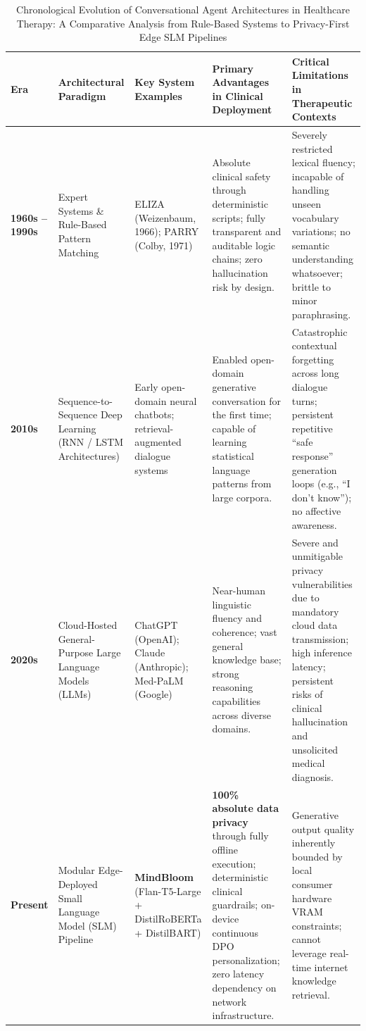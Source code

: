 \documentclass[12pt,twoside]{article}
\begin{document}
\begin{table}[p]
\centering
\Large
\renewcommand{\arraystretch}{4.2}
\setlength{\tabcolsep}{14pt}
\begin{adjustbox}{max width=\textwidth, max totalheight=0.88\textheight, keepaspectratio}
\begin{tabular}{|p{3.0cm}|p{5.2cm}|p{4.8cm}|p{7.0cm}|p{8.5cm}|}
\hline
\rowcolor{gray!20}
\textbf{Era} & \textbf{Architectural Paradigm} & \textbf{Key System Examples} & \textbf{Primary Advantages in Clinical Deployment} & \textbf{Critical Limitations in Therapeutic Contexts} \\
\hline
\textbf{1960s -- 1990s} & Expert Systems \& Rule-Based Pattern Matching & ELIZA (Weizenbaum, 1966); PARRY (Colby, 1971) & Absolute clinical safety through deterministic scripts; fully transparent and auditable logic chains; zero hallucination risk by design. & Severely restricted lexical fluency; incapable of handling unseen vocabulary variations; no semantic understanding whatsoever; brittle to minor paraphrasing. \\
\hline
\textbf{2010s} & Sequence-to-Sequence Deep Learning (RNN / LSTM Architectures) & Early open-domain neural chatbots; retrieval-augmented dialogue systems & Enabled open-domain generative conversation for the first time; capable of learning statistical language patterns from large corpora. & Catastrophic contextual forgetting across long dialogue turns; persistent repetitive ``safe response'' generation loops (e.g., ``I don't know''); no affective awareness. \\
\hline
\textbf{2020s} & Cloud-Hosted General-Purpose Large Language Models (LLMs) & ChatGPT (OpenAI); Claude (Anthropic); Med-PaLM (Google) & Near-human linguistic fluency and coherence; vast general knowledge base; strong reasoning capabilities across diverse domains. & Severe and unmitigable privacy vulnerabilities due to mandatory cloud data transmission; high inference latency; persistent risks of clinical hallucination and unsolicited medical diagnosis. \\
\hline
\textbf{Present} & Modular Edge-Deployed Small Language Model (SLM) Pipeline & \textbf{MindBloom} (Flan-T5-Large + DistilRoBERTa + DistilBART) & \textbf{100\% absolute data privacy} through fully offline execution; deterministic clinical guardrails; on-device continuous DPO personalization; zero latency dependency on network infrastructure. & Generative output quality inherently bounded by local consumer hardware VRAM constraints; cannot leverage real-time internet knowledge retrieval. \\
\hline
\end{tabular}
\end{adjustbox}
\caption{Chronological Evolution of Conversational Agent Architectures in Healthcare Therapy: A Comparative Analysis from Rule-Based Systems to Privacy-First Edge SLM Pipelines}
\label{tab:evolution}
\end{table}
\end{document}
